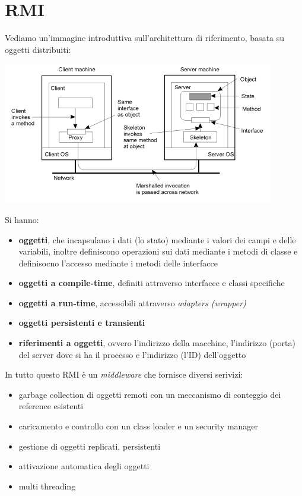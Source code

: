 \documentclass[a4paper,12pt, oneside]{book}
\begin{document}
\section{RMI}
Vediamo un'immagine introduttiva sull'architettura di riferimento, basata su oggetti distribuiti:
\begin{center}
\includegraphics[scale=0.7]{img/rmi.png}
\end{center}
Si hanno:
\begin{itemize}
\item \textbf{oggetti}, che incapsulano i dati (lo stato) mediante i valori dei
  campi e delle variabili, inoltre definiscono operazioni sui dati mediante
  i metodi di classe e definisocno l'accesso mediante i metodi delle interfacce
\item \textbf{oggetti a compile-time}, definiti attraverso interfacce e classi
  specifiche
\item \textbf{oggetti a run-time}, accessibili attraverso \textit{adapters (wrapper)}
\item \textbf{oggetti persistenti e transienti}
\item \textbf{riferimenti a oggetti}, ovvero l'indirizzo della macchine, l'indirizzo (porta)
  del server dove si ha il processo e l'indirizzo (l'ID) dell'oggetto
\end{itemize}
In tutto questo RMI è un \textit{middleware} che fornisce diversi serivizi:
\begin{itemize}
\item garbage collection di oggetti remoti con un meccanismo di conteggio dei reference esistenti
\item caricamento e controllo con un class loader e un security manager
\item gestione di oggetti replicati, persistenti
\item attivazione automatica degli oggetti
\item multi threading
\end{itemize}
\end{document}
